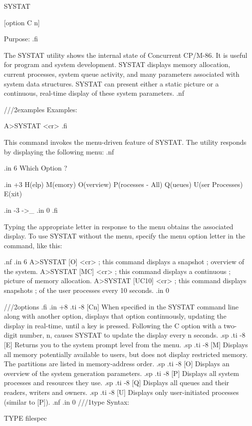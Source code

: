 SYSTAT {[option {C} {n}]

Purpose:
.fi

The SYSTAT utility shows the internal state of Concurrent CP/M-86.
It is useful for program and system development. SYSTAT displays 
memory allocation, current processes, system queue activity, and
many parameters associated with system data structures. SYSTAT can
present either a static picture or a continuous, real-time display
of these system parameters.
.nf

///2examples
Examples:

      A>SYSTAT <cr>
.fi 

This command invokes the menu-driven feature of SYSTAT. The utility
responds by displaying the following menu:
.nf

.in 6
Which Option ?

.in +3
H(elp)
M(emory)
O(verview)
P(rocesses - All)
Q(ueues)
U(ser Processes)
E(xit)

.in -3
->_
.in 0
.fi


Typing the appropriate letter in response to the menu obtains the
associated display. To use SYSTAT without the menu, specify the menu
option letter in the command, like this:

.nf
.in 6
A>SYSTAT [O] <cr>    ; this command displays a snapshot 
                     ; overview of the system.
A>SYSTAT [MC] <cr>   ; this command displays a continuous
                     ; picture of memory allocation.
A>SYSTAT [UC10] <cr> ; this command displays snapshots
                     ; of the user processes every 10 seconds.
.in 0

///2options
.fi
.in +8
.ti -8
[Cn]    When specified in the SYSTAT command line along with another 
option, displays that option continuously, updating the display 
in real-time,  until a key is pressed.  Following the C 
option with a two-digit number, n, causes SYSTAT to update 
the display every n seconds.
.sp
.ti -8
[E]     Returns you to the system prompt level from the menu.
.sp
.ti -8
[M]     Displays all memory potentially available to users, but 
does not display restricted memory.  The partitions are 
listed in memory-address order.
.sp
.ti -8
[O]     Displays an overview of the system generation parameters.
.sp
.ti -8
[P]     Displays all system processes and resources they use.
.sp
.ti -8
[Q]     Displays all queues and their readers, writers and owners.
.sp
.ti -8
[U]     Displays only user-initiated processes (similar to [P]).
.nf
.in 0
///1type
Syntax: 

TYPE filespec

}

